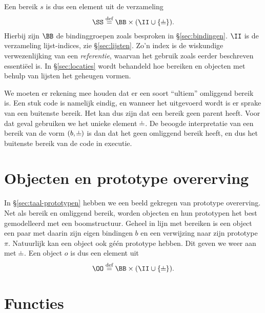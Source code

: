 Een bereik $s$ is dus een element uit de verzameling
%
\begin{equation*}
  \SS \DEF \BB \times (\II \cup \{\nil\}).
\end{equation*}
%
Hierbij zijn $\BB$ de bindinggroepen zoals besproken in §\ref{sec:bindingen}. $\II$ is de verzameling lijst-indices, zie §\ref{sec:lijsten}. Zo'n index is de wiskundige verwezenlijking van een \emph{referentie}, waarvan het gebruik zoals eerder beschreven essentiëel is. In §\ref{sec:locaties} wordt behandeld hoe bereiken en objecten met behulp van lijsten het geheugen vormen.

We moeten er rekening mee houden dat er een soort “ultiem” omliggend bereik is. Een stuk code is namelijk eindig, en wanneer het uitgevoerd wordt is er sprake van een buitenste bereik. Het kan dus zijn dat een bereik geen parent heeft. Voor dat geval gebruiken we het unieke element $\nil$. De beoogde interpretatie van een bereik van de vorm $(b, \nil)$ is dan dat het geen omliggend bereik heeft, en dus het buitenste bereik van de code in executie.

\section{Objecten en prototype overerving}
\label{sec:sem-objecten}

In §\ref{sec:taal-prototypen} hebben we een beeld gekregen van prototype overerving. Net als bereik en omliggend bereik, worden objecten en hun prototypen het best gemodelleerd met een boomstructuur. Geheel in lijn met bereiken is een object een paar met daarin zijn eigen bindingen $b$ en een verwijzing naar zijn prototype $\pi$. Natuurlijk kan een object ook géén prototype hebben. Dit geven we weer aan met $\nil$. Een object $o$ is dus een element uit
%
\begin{equation*}
  \OO \DEF \BB \times (\II \cup \{\nil\}).
\end{equation*}

\section{Functies}
\label{sec:functies}

